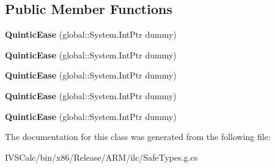 \subsection*{Public Member Functions}
\begin{DoxyCompactItemize}
\item 
\mbox{\label{class_windows_1_1_u_i_1_1_xaml_1_1_media_1_1_animation_1_1_quintic_ease_aa1838962ed41bc10a966ac3085b262f6}} 
{\bfseries Quintic\+Ease} (global\+::\+System.\+Int\+Ptr dummy)
\item 
\mbox{\label{class_windows_1_1_u_i_1_1_xaml_1_1_media_1_1_animation_1_1_quintic_ease_aa1838962ed41bc10a966ac3085b262f6}} 
{\bfseries Quintic\+Ease} (global\+::\+System.\+Int\+Ptr dummy)
\item 
\mbox{\label{class_windows_1_1_u_i_1_1_xaml_1_1_media_1_1_animation_1_1_quintic_ease_aa1838962ed41bc10a966ac3085b262f6}} 
{\bfseries Quintic\+Ease} (global\+::\+System.\+Int\+Ptr dummy)
\item 
\mbox{\label{class_windows_1_1_u_i_1_1_xaml_1_1_media_1_1_animation_1_1_quintic_ease_aa1838962ed41bc10a966ac3085b262f6}} 
{\bfseries Quintic\+Ease} (global\+::\+System.\+Int\+Ptr dummy)
\item 
\mbox{\label{class_windows_1_1_u_i_1_1_xaml_1_1_media_1_1_animation_1_1_quintic_ease_aa1838962ed41bc10a966ac3085b262f6}} 
{\bfseries Quintic\+Ease} (global\+::\+System.\+Int\+Ptr dummy)
\end{DoxyCompactItemize}


The documentation for this class was generated from the following file\+:\begin{DoxyCompactItemize}
\item 
I\+V\+S\+Calc/bin/x86/\+Release/\+A\+R\+M/ilc/Safe\+Types.\+g.\+cs\end{DoxyCompactItemize}
